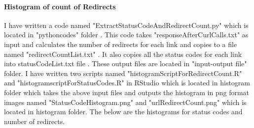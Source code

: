\documentclass[12pt]{Report}
\begin{document}
\paragraph{Histogram of count of Redirects }

I have written a code named "ExtractStatusCodeAndRedirectCount.py" which is located in "pythoncodes" folder . This code takes "responseAfterCurlCalls.txt" as input and calculates the number of redirects for each link and copies to a file named "redirectCountList.txt" . It also copies all the status codes for each link into statusCodeList.txt file . These output files are located in "input-output file" folder.
I have written two scripts named "histogramScriptForRedirectCount.R" and "histogramscriptForStatusCodes.R" in RStudio which is located in histogram folder  which takes the above  input files and outputs the histogram in png format images named "StatusCodeHistogram.png" and "urlRedirectCount.png" which is located in histogram folder.
The below are the histograms for status codes and number of redirects.



\newpage
\end{document}
